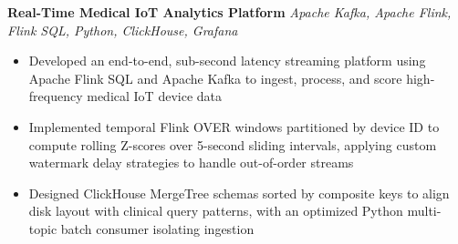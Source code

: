 \documentclass[letterpaper,10pt]{article}
\newenvironment{resumeitems}{\begin{itemize}}{\end{itemize}}
\newcommand{\SecondProjectTitle}{Real-Time Medical IoT Analytics Platform}
\newcommand{\SecondProjectContext}{Apache Kafka, Apache Flink, Flink SQL, Python, ClickHouse, Grafana}
\newcommand{\SecondProjectBulletOne}{Developed an end-to-end, sub-second latency streaming platform using Apache Flink SQL and Apache Kafka to ingest, process, and score high-frequency medical IoT device data}
\newcommand{\SecondProjectBulletTwo}{Implemented temporal Flink OVER windows partitioned by device ID to compute rolling Z-scores over 5-second sliding intervals, applying custom watermark delay strategies to handle out-of-order streams}
\newcommand{\SecondProjectBulletThree}{Designed ClickHouse MergeTree schemas sorted by composite keys to align disk layout with clinical query patterns, with an optimized Python multi-topic batch consumer isolating ingestion}
\begin{document}
\textbf{\SecondProjectTitle} \hfill \textit{\SecondProjectContext}
\begin{resumeitems}
\item \SecondProjectBulletOne
\item \SecondProjectBulletTwo
\item \SecondProjectBulletThree
\end{resumeitems}
\end{document}
